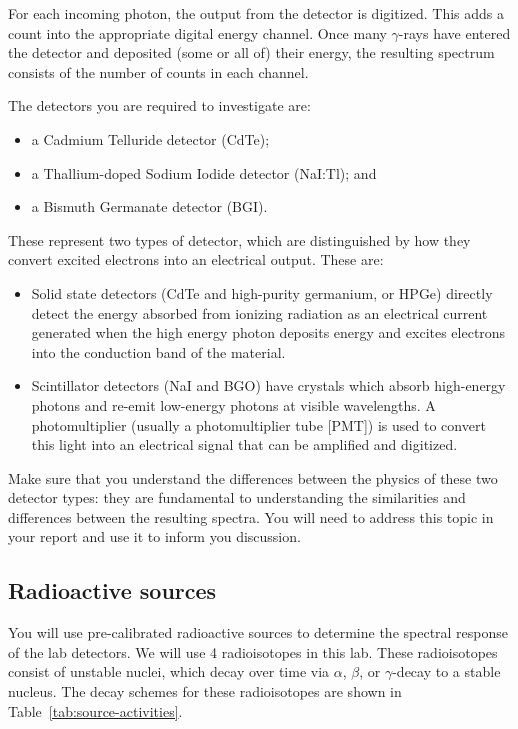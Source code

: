 \documentclass{tufte-book}
\newcommand{\textgamma}{\ensuremath{\gamma}} %
\newcommand{\textalpha}{\ensuremath{\alpha}}
\renewcommand{\textbeta}{\ensuremath{\beta}}
\newcommand{\gmray}{\ensuremath{\gamma}-ray}
\begin{document}
For each incoming photon, the output from the detector is digitized. This adds a count into the appropriate digital energy channel. Once many \gmray s have entered the detector and deposited (some or all of) their energy, the resulting spectrum consists of the number of counts in each channel.

The detectors you are required to investigate are:

\begin{itemize}
    \item 
        a Cadmium Telluride detector (CdTe);
    \item  
        a Thallium-doped Sodium Iodide detector (NaI:Tl); and
    \item 
        a Bismuth Germanate detector (BGI).
\end{itemize}

These represent two types of detector, which are distinguished by how they convert excited electrons into an electrical output. These are:

\begin{itemize}
    \item 
        Solid state detectors (CdTe and high-purity germanium, or HPGe) directly detect the energy absorbed from ionizing radiation as an electrical current generated when the high energy photon deposits energy and excites electrons into the conduction band of the material.
    \item 
        Scintillator detectors (NaI and BGO) have crystals which absorb high-energy photons and re-emit low-energy photons at visible wavelengths. A photomultiplier (usually a photomultiplier tube [PMT]) is used to convert this light into an electrical signal that can be amplified and digitized.
\end{itemize}

Make sure that you understand the differences between the physics of these two detector types: they are fundamental to understanding the similarities and differences between the resulting spectra. You will need to address this topic in your report and use it to inform you discussion.

\subsection{Radioactive sources}

You will use pre-calibrated radioactive sources to determine the spectral response of the lab detectors. We will use 4 radioisotopes in this lab. These radioisotopes consist of unstable nuclei, which decay over time via \textalpha, \textbeta, or \textgamma-decay to a stable nucleus. The decay schemes for these radioisotopes are shown in Table~\ref{tab:source-activities}.
\end{document}
